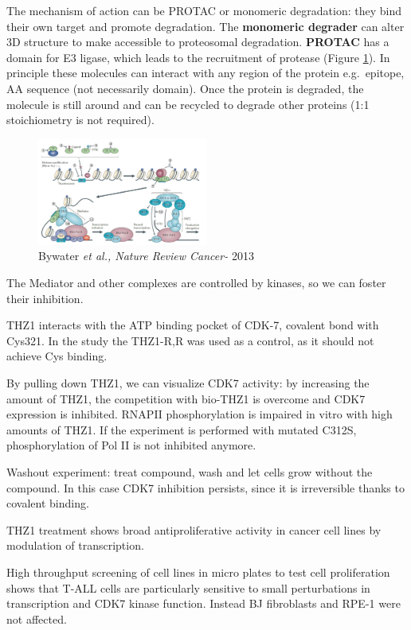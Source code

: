 The mechanism of action can be PROTAC or monomeric degradation: they bind their own target and promote degradation. The \textbf{monomeric degrader} can alter 3D structure to make accessible to proteosomal degradation. \textbf{PROTAC} has a domain for E3 ligase, which leads to the recruitment of protease (Figure \ref{fig:protac}). In principle these molecules can interact with any region of the protein e.g.~epitope, AA sequence (not necessarily domain). Once the protein is degraded, the molecule is still around and can be recycled to degrade other proteins (1:1 stoichiometry is not required).

\begin{figure}
\centering
\includegraphics[width=0.5\textwidth]{../_resources/Screen_Shot_2022-11-04_at_11-55-34.png}
\caption{Bywater \emph{et al., Nature Review Cancer-} 2013}
\label{fig:protac}
\end{figure}


The Mediator and other complexes are controlled by kinases, so we can foster their inhibition.

THZ1 interacts with the ATP binding pocket of CDK-7, covalent bond with Cys321. In the study the THZ1-R,R was used as a control, as it should not achieve Cys binding.

By pulling down THZ1, we can visualize CDK7 activity: by increasing the amount of THZ1, the competition with bio-THZ1 is overcome and CDK7 expression is inhibited. RNAPII phosphorylation is impaired in vitro with high amounts of THZ1. If the experiment is performed with mutated C312S, phosphorylation of Pol II is not inhibited anymore.

Washout experiment: treat compound, wash and let cells grow without the compound. In this case CDK7 inhibition persists, since it is irreversible thanks to covalent binding.

THZ1 treatment shows broad antiproliferative activity in cancer cell lines by modulation of transcription.

High throughput screening of cell lines in micro plates to test cell proliferation shows that T-ALL cells are particularly sensitive to small perturbations in transcription and CDK7 kinase function. Instead BJ fibroblasts and RPE-1 were not affected.


